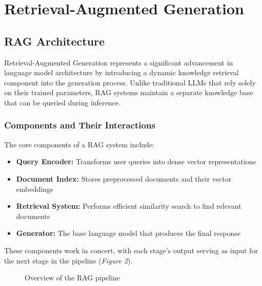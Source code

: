 \documentclass[12pt]{article}
\begin{document}
    \section{Retrieval-Augmented Generation}
    \subsection{RAG Architecture}
    Retrieval-Augmented Generation represents a significant advancement in language model architecture 
    by introducing a dynamic knowledge retrieval component into the generation process. Unlike 
    traditional LLMs that rely solely on their trained parameters, RAG systems maintain a separate 
    knowledge base that can be queried during inference.
    \newpage
    \subsubsection{Components and Their Interactions}
    The core components of a RAG system include:
    \begin{itemize}
    \item \textbf{Query Encoder:} Transforms user queries into dense vector representations
    \item \textbf{Document Index:} Stores preprocessed documents and their vector embeddings
    \item \textbf{Retrieval System:} Performs efficient similarity search to find relevant documents
    \item \textbf{Generator:} The base language model that produces the final response
    \end{itemize}
    These components work in concert, with each stage's output serving as input for the next stage in the pipeline (\textit{Figure 2}).

    \begin{figure}[h!]
        \vspace{1cm}
        \centering
        \caption{Overview of the RAG pipeline \cite{prompt_engineering}}
    \end{figure}
\end{document}
